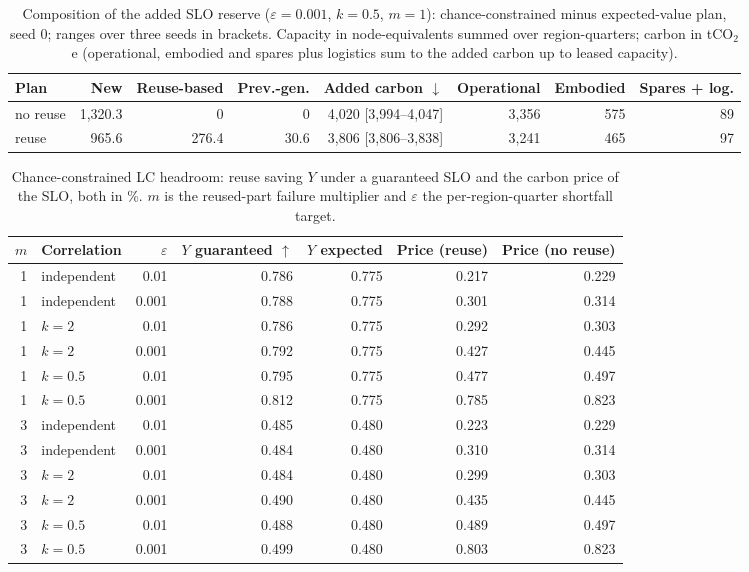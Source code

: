 \documentclass[11pt]{article}
\begin{document}
\begin{table}[!htbp]
  \centering
  \caption{Composition of the added SLO reserve ($\varepsilon=0.001$, $k=0.5$, $m=1$): chance-constrained minus expected-value plan, seed 0; ranges over three seeds in brackets. Capacity in node-equivalents summed over region-quarters; carbon in tCO$_2$e (operational, embodied and spares plus logistics sum to the added carbon up to leased capacity).}
  \label{tab:reserve}
  \small
  \begin{tabular}{lrrrrrrr}
    \toprule
    Plan & New & Reuse-based & Prev.-gen. & Added carbon $\downarrow$ & Operational & Embodied & Spares + log. \\
    \midrule
    no reuse & 1{,}320.3 & 0 & 0 & 4{,}020 [3{,}994--4{,}047] & 3{,}356 & 575 & 89 \\
    reuse & 965.6 & 276.4 & 30.6 & 3{,}806 [3{,}806--3{,}838] & 3{,}241 & 465 & 97 \\
    \bottomrule
  \end{tabular}
\end{table}

\begin{table}[!htbp]
  \centering
  \caption{Chance-constrained LC headroom: reuse saving $Y$ under a guaranteed SLO and the carbon price of the SLO, both in \%. $m$ is the reused-part failure multiplier and $\varepsilon$ the per-region-quarter shortfall target.}
  \label{tab:slo}
  \begin{tabular}{rlrrrrr}
    \toprule
    $m$ & Correlation & $\varepsilon$ & $Y$ guaranteed $\uparrow$ & $Y$ expected & Price (reuse) & Price (no reuse) \\
    \midrule
    1 & independent & 0.01 & 0.786 & 0.775 & 0.217 & 0.229 \\
    1 & independent & 0.001 & 0.788 & 0.775 & 0.301 & 0.314 \\
    1 & $k=2$ & 0.01 & 0.786 & 0.775 & 0.292 & 0.303 \\
    1 & $k=2$ & 0.001 & 0.792 & 0.775 & 0.427 & 0.445 \\
    1 & $k=0.5$ & 0.01 & 0.795 & 0.775 & 0.477 & 0.497 \\
    1 & $k=0.5$ & 0.001 & 0.812 & 0.775 & 0.785 & 0.823 \\
    3 & independent & 0.01 & 0.485 & 0.480 & 0.223 & 0.229 \\
    3 & independent & 0.001 & 0.484 & 0.480 & 0.310 & 0.314 \\
    3 & $k=2$ & 0.01 & 0.484 & 0.480 & 0.299 & 0.303 \\
    3 & $k=2$ & 0.001 & 0.490 & 0.480 & 0.435 & 0.445 \\
    3 & $k=0.5$ & 0.01 & 0.488 & 0.480 & 0.489 & 0.497 \\
    3 & $k=0.5$ & 0.001 & 0.499 & 0.480 & 0.803 & 0.823 \\
    \bottomrule
  \end{tabular}
\end{table}
\end{document}
